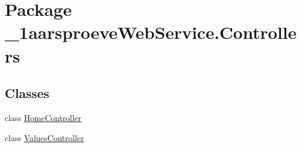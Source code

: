 \hypertarget{namespace__1aarsproeve_web_service_1_1_controllers}{}\section{Package \+\_\+1aarsproeve\+Web\+Service.\+Controllers}
\label{namespace__1aarsproeve_web_service_1_1_controllers}
\subsection*{Classes}
\begin{DoxyCompactItemize}
\item 
class \hyperlink{class__1aarsproeve_web_service_1_1_controllers_1_1_home_controller}{Home\+Controller}
\item 
class \hyperlink{class__1aarsproeve_web_service_1_1_controllers_1_1_values_controller}{Values\+Controller}
\end{DoxyCompactItemize}
